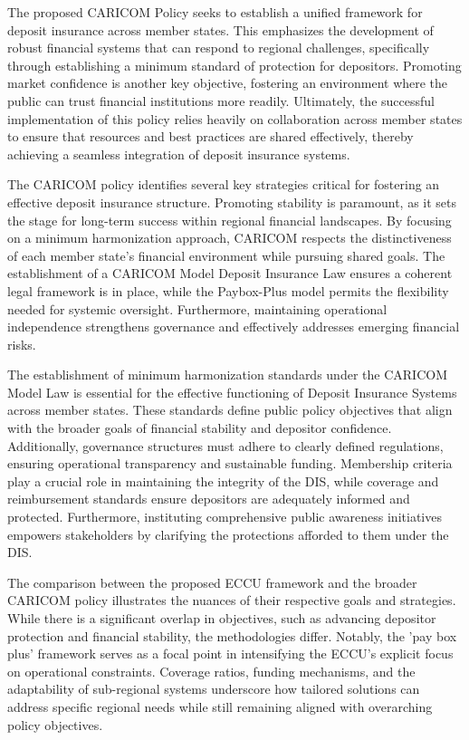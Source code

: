 The proposed CARICOM Policy seeks to establish a unified framework for deposit insurance across member states. This emphasizes the development of robust financial systems that can respond to regional challenges, specifically through establishing a minimum standard of protection for depositors. Promoting market confidence is another key objective, fostering an environment where the public can trust financial institutions more readily. Ultimately, the successful implementation of this policy relies heavily on collaboration across member states to ensure that resources and best practices are shared effectively, thereby achieving a seamless integration of deposit insurance systems.

The CARICOM policy identifies several key strategies critical for fostering an effective deposit insurance structure. Promoting stability is paramount, as it sets the stage for long-term success within regional financial landscapes. By focusing on a minimum harmonization approach, CARICOM respects the distinctiveness of each member state's financial environment while pursuing shared goals. The establishment of a CARICOM Model Deposit Insurance Law ensures a coherent legal framework is in place, while the Paybox-Plus model permits the flexibility needed for systemic oversight. Furthermore, maintaining operational independence strengthens governance and effectively addresses emerging financial risks.

The establishment of minimum harmonization standards under the CARICOM Model Law is essential for the effective functioning of Deposit Insurance Systems across member states. These standards define public policy objectives that align with the broader goals of financial stability and depositor confidence. Additionally, governance structures must adhere to clearly defined regulations, ensuring operational transparency and sustainable funding. Membership criteria play a crucial role in maintaining the integrity of the DIS, while coverage and reimbursement standards ensure depositors are adequately informed and protected. Furthermore, instituting comprehensive public awareness initiatives empowers stakeholders by clarifying the protections afforded to them under the DIS.

The comparison between the proposed ECCU framework and the broader CARICOM policy illustrates the nuances of their respective goals and strategies. While there is a significant overlap in objectives, such as advancing depositor protection and financial stability, the methodologies differ. Notably, the 'pay box plus' framework serves as a focal point in intensifying the ECCU's explicit focus on operational constraints. Coverage ratios, funding mechanisms, and the adaptability of sub-regional systems underscore how tailored solutions can address specific regional needs while still remaining aligned with overarching policy objectives.

